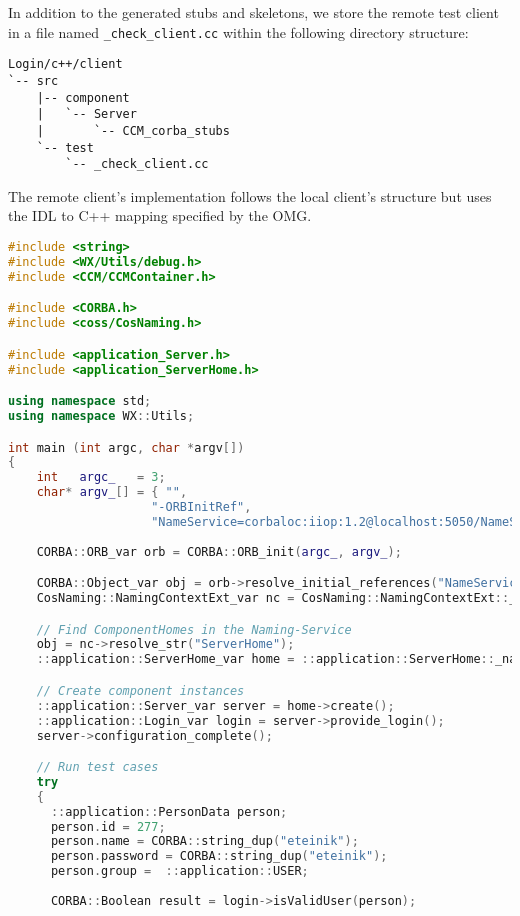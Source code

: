 In addition to the generated stubs and skeletons, we store the remote test
client in a file named {\tt \_check\_client.cc} within the following directory structure:
\begin{footnotesize}
\begin{verbatim}
Login/c++/client
`-- src
    |-- component
    |   `-- Server
    |       `-- CCM_corba_stubs
    `-- test
        `-- _check_client.cc
\end{verbatim}
\end{footnotesize}

The remote client's implementation follows the local client's structure but uses
the IDL to C++ mapping specified by the OMG.

\begin{footnotesize}
\begin{lstlisting}[language=C++]
#include <string>
#include <WX/Utils/debug.h>
#include <CCM/CCMContainer.h>

#include <CORBA.h>
#include <coss/CosNaming.h>

#include <application_Server.h>
#include <application_ServerHome.h>

using namespace std;
using namespace WX::Utils;

int main (int argc, char *argv[])
{
    int   argc_   = 3;
    char* argv_[] = { "", 
                    "-ORBInitRef", 
                    "NameService=corbaloc:iiop:1.2@localhost:5050/NameService"};
 
    CORBA::ORB_var orb = CORBA::ORB_init(argc_, argv_);

    CORBA::Object_var obj = orb->resolve_initial_references("NameService");
    CosNaming::NamingContextExt_var nc = CosNaming::NamingContextExt::_narrow(obj);

    // Find ComponentHomes in the Naming-Service
    obj = nc->resolve_str("ServerHome");
    ::application::ServerHome_var home = ::application::ServerHome::_narrow(obj);

    // Create component instances
    ::application::Server_var server = home->create();
    ::application::Login_var login = server->provide_login();
    server->configuration_complete();

	// Run test cases
    try 
    {
      ::application::PersonData person;
      person.id = 277;
      person.name = CORBA::string_dup("eteinik");
      person.password = CORBA::string_dup("eteinik");   
      person.group =  ::application::USER;       
      
      CORBA::Boolean result = login->isValidUser(person);
      

\end{lstlisting}
\end{footnotesize}

